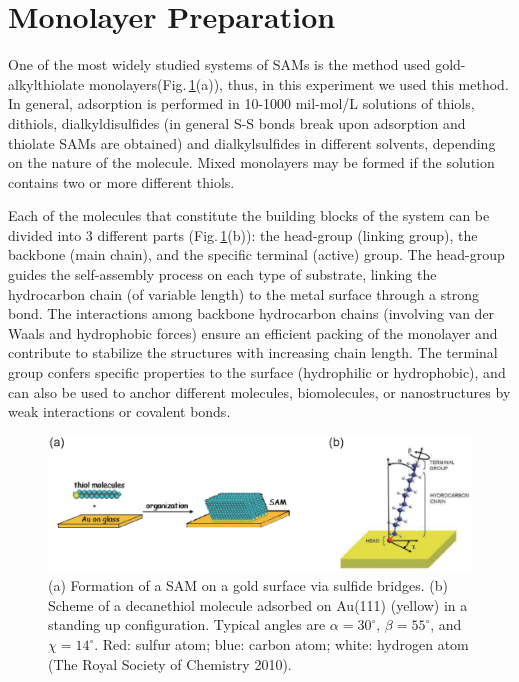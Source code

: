 \section{Monolayer Preparation}

One of the most widely studied systems of SAMs is the method used gold-alkylthiolate monolayers(Fig.\,\ref{sam1}(a)), thus, in this experiment we used this method.
In general, adsorption is performed in 10-1000 mil-mol/L solutions of thiols, dithiols,
dialkyldisulfides (in general S-S bonds break upon adsorption and thiolate SAMs are obtained) and dialkylsulfides in different solvents, depending on the nature of the molecule.
Mixed monolayers may be formed if the solution contains two or more different thiols.

Each of the molecules that constitute the building blocks of the system can be
divided into 3 different parts (Fig.\,\ref{sam1}(b)):
the head-group (linking group), the backbone (main chain), and the specific terminal (active) group. The head-group guides the self-assembly process on each type of substrate, linking the hydrocarbon chain (of variable length) to the metal surface through a strong bond.
The interactions among backbone hydrocarbon chains (involving van der Waals and hydrophobic forces) ensure an efficient packing of the monolayer and contribute to stabilize the structures with increasing chain length.
The terminal group confers specific properties to the surface (hydrophilic or hydrophobic), and can also be used to anchor different molecules, biomolecules, or nanostructures by weak interactions or covalent bonds.


\begin{figure}[h]
\centering
\includegraphics[width=0.9\columnwidth]{sam.eps}
\caption{(a) Formation of a SAM on a gold surface via sulfide bridges. (b) Scheme of a decanethiol molecule adsorbed on Au(111) (yellow) in a standing up configuration. Typical angles are $\alpha=30^\circ$, $\beta=55^\circ$, and $\chi=14^\circ$. Red: sulfur atom; blue: carbon atom; white: hydrogen atom (The Royal Society of Chemistry 2010).}
\label{sam1}
\end{figure}


